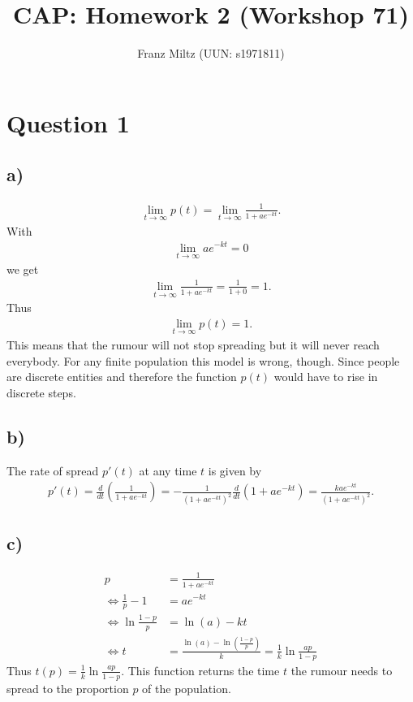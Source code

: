 \documentclass{article}
\title{CAP: Homework 2 (Workshop 71)}
\author{Franz Miltz (UUN: s1971811)}
\begin{document}
\maketitle
\section*{Question 1}
\subsection*{a)}
\begin{align*}
	\lim_{t\to\infty} p(t) = \lim_{t\to\infty} \frac{1}{1+ae^{-kt}}.
\end{align*}
With
\begin{align*}
	\lim_{t\to\infty} ae^{-kt} = 0
\end{align*}
we get
\begin{align*}
	\lim_{t\to\infty}\frac{1}{1+ae^{-kt}}=\frac{1}{1+0}=1.
\end{align*}
Thus
\begin{align*}
	\lim_{t\to\infty}p(t)=1.
\end{align*}
This means that the rumour will not stop spreading but it will never reach everybody.
For any finite population this model is wrong, though.
Since people are discrete entities and therefore the function $p(t)$ would have to rise in discrete steps.
\subsection*{b)}
The rate of spread $p'(t)$ at any time $t$ is given by
\begin{align*}
	p'(t)=\frac{d}{dt}\left(\frac{1}{1+ae^{-kt}}\right)=-\frac{1}{(1+ae^{-kt})^2}\frac{d}{dt}(1+ae^{-kt})
	=\frac{kae^{-kt}}{(1+ae^{-kt})^2}.
\end{align*}
\subsection*{c)}
\begin{align*}
	p                                 & =\frac{1}{1+ae^{-kt}}                                              \\
	\Leftrightarrow \frac{1}{p}-1     & =ae^{-kt}                                                          \\
	\Leftrightarrow \ln \frac{1-p}{p} & = \ln(a) -kt                                                       \\
	\Leftrightarrow t                 & = \frac{\ln(a)-\ln(\frac{1-p}{p})}{k}=\frac{1}{k}\ln\frac{ap}{1-p}
\end{align*}
Thus $t(p)=\frac{1}{k}\ln \frac{ap}{1-p}$. This function returns the time $t$ the rumour needs to spread to the proportion $p$ of the population.
\end{document}
